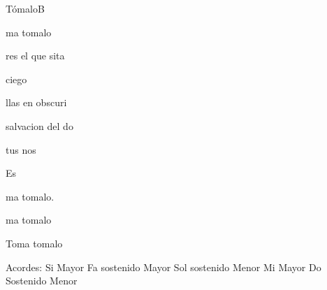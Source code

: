 \documentclass[12pt, spanish]{book}
\begin{document}
\begin{song}{Tómalo}{B}
\begin{SBChorus}
            ma tomalo
        \end{SBChorus}

        \begin{SBOpGroup}
            res el que sita

             ciego 

            llas en  obscuri

              salvacion del do

             tus nos

            Es
        \end{SBOpGroup}

        \begin{SBOpGroup}
            ma tomalo.

            ma tomalo

            Toma tomalo 
        \end{SBOpGroup}

        \ifChordBk
        \begin{SBOpGroup}
            Acordes:\break
            \upchord{\B}\qquad\qquad Si Mayor \hfill
            \upchord{\Fs}Fa sostenido Mayor \hfill\null\break
            \upchord{\Gsm}\qquad Sol sostenido Menor \hfill
            \upchord{\E}\qquad Mi Mayor \hfill\null\break
            \upchord{\Csm}\qquad Do Sostenido Menor \hfill\null\break
        \end{SBOpGroup}
        \fi
    \end{song}
\end{document}
